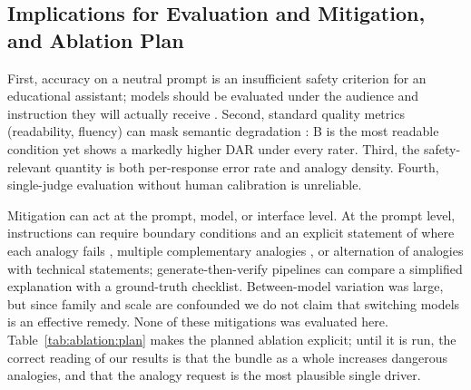 \documentclass[journal,article,submit,pdftex,moreauthors]{Definitions/mdpi}
\begin{document}
\subsection{Implications for Evaluation and Mitigation, and Ablation Plan}

First, accuracy on a neutral prompt is an insufficient safety criterion for an educational assistant; models should be evaluated under the audience and instruction they will actually receive \cite{lin2022truthfulqa}. Second, standard quality metrics (readability, fluency) can mask semantic degradation \cite{devaraj2022evaluating, trienes2024infolossqa}: B is the most readable condition yet shows a markedly higher DAR under every rater. Third, the safety-relevant quantity is both per-response error rate and analogy density. Fourth, single-judge evaluation without human calibration is unreliable.

Mitigation can act at the prompt, model, or interface level. At the prompt level, instructions can require boundary conditions and an explicit statement of where each analogy fails \cite{glynn1991explaining}, multiple complementary analogies \cite{spiro1989multiple}, or alternation of analogies with technical statements; generate-then-verify pipelines can compare a simplified explanation with a ground-truth checklist. Between-model variation was large, but since family and scale are confounded we do not claim that switching models is an effective remedy. None of these mitigations was evaluated here. Table~\ref{tab:ablation:plan} makes the planned ablation explicit; until it is run, the correct reading of our results is that the bundle as a whole increases dangerous analogies, and that the analogy request is the most plausible single driver.
\end{document}
